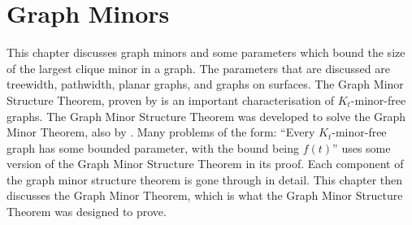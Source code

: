 \chapter{Graph Minors}\label{chap:gmst}
This chapter discusses graph minors and some parameters which bound the size of the largest clique minor in a graph. The parameters that are discussed are treewidth, pathwidth, planar graphs, and graphs on surfaces. 
The Graph Minor Structure Theorem, proven by \textcite{robertsonGraphMinorsXVI2003} is an important characterisation of $K_t$-minor-free graphs. The Graph Minor Structure Theorem was developed to solve the Graph Minor Theorem, also by \textcite{robertsonGraphMinorsXX2004}. Many problems of the form: ``Every $K_t$-minor-free graph has some bounded parameter, with the bound being $f(t)$'' uses some version of the Graph Minor Structure Theorem in its proof. 
Each component of the graph minor structure theorem is gone through in detail. This chapter then discusses the Graph Minor Theorem, which is what the Graph Minor Structure Theorem was designed to prove.














\newpage
